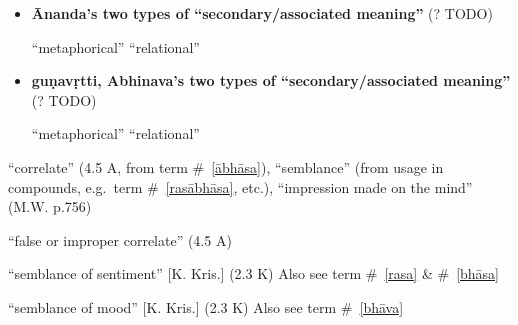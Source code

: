 \documentclass[12pt]{article}
\begin{document}
\begin{multicols}{2}
\begin{enumerate}
		\begin{itemize}
			\item \textbf{Ānanda's two types of ``secondary/associated meaning''} (? TODO)
			      \begin{enumerate}
				       ``metaphorical''
				       ``relational''
			      \end{enumerate}

			\item \textbf{guṇavṛtti, Abhinava's two types of ``secondary/associated meaning''} (? TODO)
			      \begin{enumerate}
				       ``metaphorical''
				       ``relational''
			      \end{enumerate}
		\end{itemize}

		 ``correlate'' (4.5 A, from term \#~\ref{ābhāsa}),
		``semblance'' (from usage in compounds, e.g.\ term \#~\ref{rasābhāsa}, etc.),
		``impression made on the mind'' (M.W. p.756)

		 ``false or improper correlate'' (4.5 A)

		 ``semblance of sentiment'' [K. Kris.] (2.3 K) Also see term \#~\ref{rasa} \& \#~\ref{bhāsa}

		 ``semblance of mood'' [K. Kris.] (2.3 K) Also see term \#~\ref{bhāva}


\end{enumerate}
\end{multicols}
\end{document}
